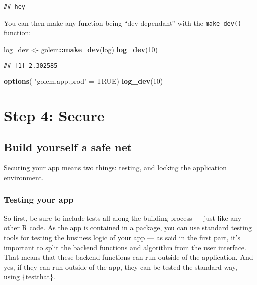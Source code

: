 \documentclass[]{book}
\newenvironment{Shaded}{\begin{snugshade}}{\end{snugshade}}
\newcommand{\DecValTok}[1]{\textcolor[rgb]{0.00,0.00,0.81}{#1}}
\newcommand{\KeywordTok}[1]{\textcolor[rgb]{0.13,0.29,0.53}{\textbf{#1}}}
\newcommand{\NormalTok}[1]{#1}
\newcommand{\OperatorTok}[1]{\textcolor[rgb]{0.81,0.36,0.00}{\textbf{#1}}}
\newcommand{\OtherTok}[1]{\textcolor[rgb]{0.56,0.35,0.01}{#1}}
\newcommand{\StringTok}[1]{\textcolor[rgb]{0.31,0.60,0.02}{#1}}
\begin{document}
\begin{verbatim}
## hey
\end{verbatim}

You can then make any function being ``dev-dependant'' with the \texttt{make\_dev()} function:

\begin{Shaded}
\begin{Highlighting}[]
\NormalTok{log_dev <-}\StringTok{ }\NormalTok{golem}\OperatorTok{::}\KeywordTok{make_dev}\NormalTok{(log)}
\KeywordTok{log_dev}\NormalTok{(}\DecValTok{10}\NormalTok{)}
\end{Highlighting}
\end{Shaded}

\begin{verbatim}
## [1] 2.302585
\end{verbatim}

\begin{Shaded}
\begin{Highlighting}[]
\KeywordTok{options}\NormalTok{( }\StringTok{"golem.app.prod"}\NormalTok{ =}\StringTok{ }\OtherTok{TRUE}\NormalTok{)}
\KeywordTok{log_dev}\NormalTok{(}\DecValTok{10}\NormalTok{)}
\end{Highlighting}
\end{Shaded}

\hypertarget{part-step-4-secure}{%
\part{Step 4: Secure}\label{part-step-4-secure}}

\hypertarget{step-secure}{%
\chapter{Build yourself a safe net}\label{step-secure}}

Securing your app means two things: testing, and locking the application environment.

\hypertarget{testing-your-app}{%
\section{Testing your app}\label{testing-your-app}}

So first, be sure to include tests all along the building process --- just like any other R code. As the app is contained in a package, you can use standard testing tools for testing the business logic of your app --- as said in the first part, it's important to split the backend functions and algorithm from the user interface. That means that these backend functions can run outside of the application. And yes, if they can run outside of the app, they can be tested the standard way, using \{testthat\}.
\end{document}
